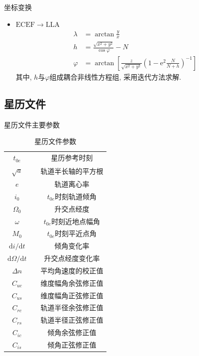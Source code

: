 \begin{frame}{坐标变换}
    \begin{itemize}
        \item $\mathrm{ECEF} \rightarrow \mathrm{LLA}$
        \begin{align*}
            \lambda &= \arctan \frac{ y }{ x } \\
            h &= \frac{ \sqrt{ x ^ 2 + y ^ 2 } }{ \cos \varphi } - N \\
            \varphi &= \arctan \left[ \frac{ z }{ \sqrt{ x ^ 2 + y ^ 2 } }
            \left( 1 - \mathrm e ^ 2 \frac{ N }{ N + h } \right) ^ { -1 }\right]
        \end{align*}
        其中, $h$与$\varphi$组成耦合非线性方程组, 采用迭代方法求解.
    \end{itemize}
\end{frame}

\subsection{星历文件}
\begin{frame}{星历文件主要参数}
\begin{table}[h!]
    \centering
    \footnotesize
    \caption{星历文件参数}
    \begin{tabular}{ccc}
        \hline
        $t _ { 0e }$ && 星历参考时刻 \\
        $\sqrt{ a }$ && 轨道半长轴的平方根 \\
        $e$ && 轨道离心率 \\
        $i _ 0$ && $t _ { 0e }$时刻轨道倾角 \\
        $\Omega _ 0$ && 升交点经度 \\
        $\omega$ && $t _ { 0e }$时刻近地点幅角 \\
        $M _ 0$ && $t _ { 0e }$时刻平近点角 \\
        $\mathrm d i / \mathrm d t$ && 倾角变化率 \\
        $\mathrm d \Omega / \mathrm d t$ && 升交点经度变化率 \\
        $\Delta n$ && 平均角速度的校正值 \\
        $C _ { uc }$ && 维度幅角余弦修正值 \\
        $C _ { us }$ && 维度幅角正弦修正值 \\
        $C _ { rc }$ && 轨道半径余弦修正值 \\
        $C _ { rs }$ && 轨道半径正弦修正值 \\
        $C _ { ic }$ && 倾角余弦修正值 \\
        $C _ { is }$ && 倾角正弦修正值 \\
        \hline
    \end{tabular}
    \label{tab:ephemeris_para}
\end{table}
\end{frame}

